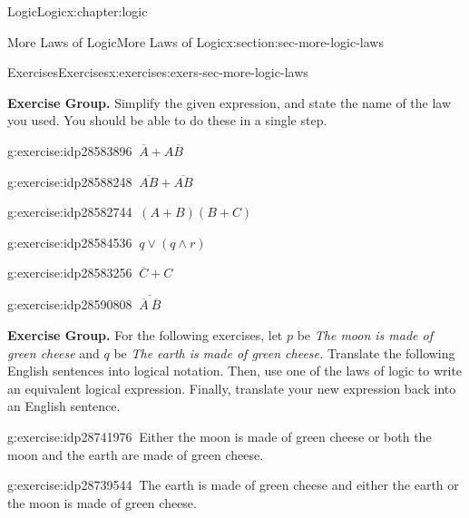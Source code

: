 \documentclass[twoside,10pt,]{book}
\numberwithin{equation}{section}
\begin{document}
\begin{chapterptx}{Logic}{}{Logic}{}{}{x:chapter:logic}
\begin{sectionptx}{More Laws of Logic}{}{More Laws of Logic}{}{}{x:section:sec-more-logic-laws}
\begin{exercises-subsection}{Exercises}{}{Exercises}{}{}{x:exercises:exers-sec-more-logic-laws}
\par\medskip\noindent%
\textbf{Exercise Group.}\space\space%
Simplify the given expression, and state the name of the law you used.  You should be able to do these in a single step.\begin{exercisegroup}
\begin{divisionexerciseeg}{15}{}{}{g:exercise:idp28583896}%
\(\ \overline{A}{}+ A\overline{B}{}\)\end{divisionexerciseeg}%
\begin{divisionexerciseeg}{16}{}{}{g:exercise:idp28588248}%
\(\ \overline{AB} + \overline{AB}\)\end{divisionexerciseeg}%
\begin{divisionexerciseeg}{17}{}{}{g:exercise:idp28582744}%
\(\ (A+B)(B+C)\)\end{divisionexerciseeg}%
\begin{divisionexerciseeg}{18}{}{}{g:exercise:idp28584536}%
\(\ q {\vee}{}(q {\wedge}{} r)\)\end{divisionexerciseeg}%
\begin{divisionexerciseeg}{19}{}{}{g:exercise:idp28583256}%
\(\ \overline{C}{} + C\)\end{divisionexerciseeg}%
\begin{divisionexerciseeg}{20}{}{}{g:exercise:idp28590808}%
\(\ \overline{\overline{A}{} ~ \overline{B}{}}\)\end{divisionexerciseeg}%
\end{exercisegroup}
\par\medskip\noindent
\par\medskip\noindent%
\textbf{Exercise Group.}\space\space%
For the following exercises, let \(p\) be \emph{The moon is made of green cheese} and \(q\) be \emph{The earth is made of green cheese.}  Translate the following English sentences into logical notation.  Then, use one of the laws of logic to write an equivalent logical expression.  Finally, translate your new expression back into an English sentence.\begin{exercisegroup}
\begin{divisionexerciseeg}{21}{}{}{g:exercise:idp28741976}%
\(\ \)Either the moon is made of green cheese or both the moon and the earth are made of green cheese.\end{divisionexerciseeg}%
\begin{divisionexerciseeg}{22}{}{}{g:exercise:idp28739544}%
\(\ \)The earth is made of green cheese and either the earth or the moon is made of green cheese.\end{divisionexerciseeg}%

\end{exercisegroup}
\end{exercises-subsection}
\end{sectionptx}
\end{chapterptx}
\end{document}
